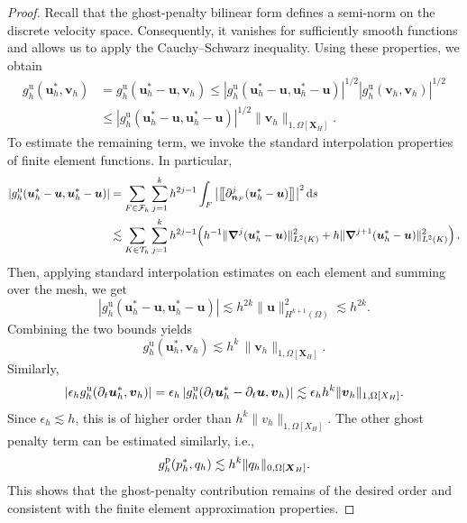\documentclass[11pt,reqno]{amsart}
\theoremstyle{definition}
\theoremstyle{plain}
\numberwithin{theorem}{section}
\numberwithin{proposition}{section}
\numberwithin{lemma}{section}
\numberwithin{equation}{section}
\newcommand{\bs}[1]{\boldsymbol{#1}}
\newcommand{\uu}[1]  {{\bs{#1}} }
\newcommand{\grad}   { \uu{\nabla}    }
\renewcommand{\(}{\bigl(}
\renewcommand{\)}{\bigr)}
\newcommand{\jump}[1]{\bigl[\hspace{-0.03in}\bigl[#1\bigr]\hspace{-0.03in}\bigr]}
\begin{document}
\begin{proof}
Recall that the ghost-penalty bilinear form defines a semi-norm on the discrete velocity space. Consequently, it vanishes for sufficiently smooth functions and allows us to apply the Cauchy--Schwarz inequality. Using these properties, we obtain
\[
\begin{split}
  g_h^{\mathrm{u}}(\boldsymbol{u}_h^*, \boldsymbol{v}_h)
  &= g_h^{\mathrm{u}}(\boldsymbol{u}_h^* - \boldsymbol{u}, \boldsymbol{v}_h)
  \le 
  |g_h^{\mathrm{u}}(\boldsymbol{u}_h^* - \boldsymbol{u}, \boldsymbol{u}_h^* - \boldsymbol{u})|^{1/2}
  |g_h^{\mathrm{u}}(\boldsymbol{v}_h, \boldsymbol{v}_h)|^{1/2} \\
  &\le
  |g_h^{\mathrm{u}}(\boldsymbol{u}_h^* - \boldsymbol{u}, \boldsymbol{u}_h^* - \boldsymbol{u})|^{1/2}
  \|\boldsymbol{v}_h\|_{1,\Omega[\boldsymbol{X}_H]} .
\end{split}
\]
To estimate the remaining term, we invoke the standard interpolation properties of finite element functions. In particular,
\[
\begin{split}
  |g_h^{\mathrm{u}}(\boldsymbol{u}_h^* - \boldsymbol{u}, \boldsymbol{u}_h^* - \boldsymbol{u})|
  &= \sum_{F\in \mathcal{F}_h} \sum_{j=1}^{k}
  h^{2j-1} \int_F
  \big|\jump{\partial^j_{\boldsymbol{n}_F} (\boldsymbol{u}_h^* - \boldsymbol{u})}\big|^2 \, \mathrm{d}s \\
  &\lesssim
  \sum_{K\in \mathcal{T}_h} \sum_{j=1}^{k}
  h^{2j-1}\!\left(
  h^{-1}\|\grad^{j}(\boldsymbol{u}_h^* - \boldsymbol{u})\|^2_{L^2(K)}
  + h\|\grad^{j+1}(\boldsymbol{u}_h^* - \boldsymbol{u})\|^2_{L^2(K)}
  \right).
\end{split}
\]
Then, applying standard interpolation estimates on each element and summing over the mesh, we get
\[
|g_h^{\mathrm{u}}(\boldsymbol{u}_h^* - \boldsymbol{u}, \boldsymbol{u}_h^* - \boldsymbol{u})|
\lesssim
h^{2k}\|\boldsymbol{u}\|^2_{H^{k+1}(\Omega)}
\lesssim h^{2k}.
\]
Combining the two bounds yields
\[
g_h^{\mathrm{u}}(\boldsymbol{u}_h^*, \boldsymbol{v}_h)
\lesssim
h^{k}\,\|\boldsymbol{v}_h\|_{1,\Omega[\boldsymbol{X}_H]}.
\]
Similarly, 
\begin{align*}
\left|
\epsilon_hg_h^{\rm u}(\partial_t{\bs u}_h^*,{\bs v}_h)
\right|
=
\epsilon_h
\left|
g_h^{\rm u}(\partial_t{\bs u}_h^*-\partial_t{\bs u},{\bs v}_h)
\right|
\lesssim
\epsilon_h h^k
\|{\bs v}_h\|_{1,\Omega[X_H]}.
\end{align*}
Since $\epsilon_h\lesssim h$, this is of higher order than $h^k\|v_h\|_{1,\Omega[X_H]}$. The other ghost penalty term can be estimated similarly, i.e., 
$$
g_h^{\rm p}(p^*_h,q_h)\lesssim h^k\|q_h\|_{0,\Omega[{\bs X}_H]}.
$$ 
This shows that the ghost-penalty contribution remains of the desired order and consistent with the finite element approximation properties. 
\end{proof}
\end{document}
